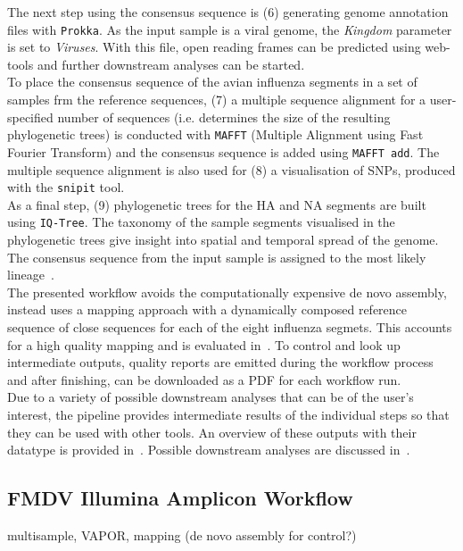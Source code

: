 The next step using the consensus sequence is (6) generating genome annotation files with \texttt{Prokka}. As the input sample is a viral genome, the \textit{Kingdom} parameter is set to \textit{Viruses}. With this file, open reading frames can be predicted using web-tools and further downstream analyses can be started. \\
To place the consensus sequence of the avian influenza segments in a set of samples frm the reference sequences, (7) a multiple sequence alignment for a user-specified number of sequences (i.e. determines the size of the resulting phylogenetic trees) is conducted with \texttt{MAFFT} (Multiple Alignment using Fast Fourier Transform) and the consensus sequence is added using \texttt{MAFFT add}. The multiple sequence alignment is also used for (8) a visualisation of SNPs, produced with the \texttt{snipit} tool. \\
As a final step, (9) phylogenetic trees for the \ac{HA} and \ac{NA} segments are built using \texttt{IQ-Tree}. The taxonomy of the sample segments visualised in the phylogenetic trees give insight into spatial and temporal spread of the genome. The consensus sequence from the input sample is assigned to the most likely lineage~\cite{minh2020iq}. \\
The presented workflow avoids the computationally expensive de novo assembly, instead uses a mapping approach with a dynamically composed reference sequence of close sequences for each of the eight influenza segmets. This accounts for a high quality mapping and is evaluated in~. To control and look up intermediate outputs, quality reports are emitted during the workflow process and after finishing, can be downloaded as a \ac{PDF} for each workflow run. \\
Due to a variety of possible downstream analyses that can be of the user's interest, the pipeline provides intermediate results of the individual steps so that they can be used with other tools. An overview of these outputs with their datatype is provided in~. Possible downstream analyses are discussed in~.


\subsection{FMDV Illumina Amplicon Workflow}
multisample, VAPOR, mapping (de novo assembly for control?)
